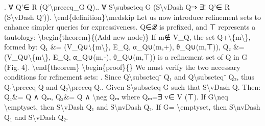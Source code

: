 \documentclass{article}%
\begin{document}
. ∀ Q'∈ R (Q'\textbackslash{}preceq\_G Q).. ∀ S\textbackslash{}subseteq G (S\textbackslash{}vDash Q⇒ ∃! Q'∈ R (S\textbackslash{}vDash Q')).\newline%
\textbackslash{}end\{definition\}\textbackslash{}medskip\newline%
\newline%
Let us now introduce refinement sets to enhance simpler queries for expressiveness. Q∈𝓠 is prefixed, and ⊤ represents a tautology:\newline%
\newline%
\textbackslash{}begin\{theorem\}\{(Add new node)\}\newline%
If m∉ V\_Q, the set Q+\textbackslash{}\{m\textbackslash{}\}, formed by:\newline%
\newline%
Q₁ \&= (V\_Q∪\textbackslash{}\{m\textbackslash{}\}, E\_Q, α\_Q∪(m,+), θ\_Q∪(m,⊤)),\newline%
\newline%
Q₂ \&= (V\_Q∪\textbackslash{}\{m\textbackslash{}\}, E\_Q, α\_Q∪(m,{-}), θ\_Q∪(m,⊤))\newline%
\newline%
is a refinement set of Q in G (Fig. 4).\newline%
\textbackslash{}end\{theorem\}\newline%
\textbackslash{}begin\{proof\}\{\}\newline%
We must verify the two necessary conditions for refinement sets:\newline%
. Since Q\textbackslash{}subseteq⁻ Q₁ and Q\textbackslash{}subseteq⁻ Q₂, thus Q₁\textbackslash{}preceq Q and Q₂\textbackslash{}preceq Q.. Given S\textbackslash{}subseteq G such that S\textbackslash{}vDash Q. Then:\newline%
\newline%
Q₁\&= Q ∧ Qₘ,\newline%
Q₂\&= Q ∧ \textbackslash{}neg Qₘ\newline%
\newline%
where Qₘ=∃ v∈ V (⊤).\newline%
If G\textbackslash{}neq \textbackslash{}emptyset, then S\textbackslash{}vDash Q₁ and S\textbackslash{}nvDash Q₂.\newline%
If G= \textbackslash{}emptyset, then S\textbackslash{}nvDash Q₁ and S\textbackslash{}vDash Q₂.\newline%
\end{document}
